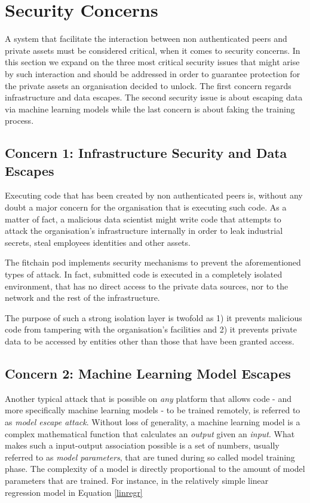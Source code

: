 \documentclass[12pt, a4paper,titlepage]{extreport}
\begin{document}
\section{Security Concerns}
A system that facilitate the interaction between non authenticated peers and private assets must be considered critical, when it comes to security concerns. In this section we expand on the three most critical security issues that might arise by such interaction and should be addressed in order to guarantee protection for the private assets an organisation decided to unlock. The first concern regards infrastructure and data escapes. The second security issue is about escaping data via machine learning models while the last concern is about faking the training process.

\subsection{Concern 1: Infrastructure Security and Data Escapes}
Executing code that has been created by non authenticated peers is, without any doubt a major concern for the organisation that is executing such code. 
As a matter of fact, a malicious data scientist might write code that attempts to attack the organisation's infrastructure internally in order to leak industrial secrets, steal employees identities and other assets.

The fitchain pod implements security mechanisms to prevent the aforementioned types of attack. In fact, submitted code is executed in a completely isolated environment, that has no direct access to the private data sources, nor to the network and the rest of the infrastructure.

The purpose of such a strong isolation layer is twofold as 1) it prevents malicious code from tampering with the organisation's facilities and 2) it prevents private data to be accessed by entities other than those that have been granted access.


\subsection{Concern 2: Machine Learning Model Escapes}
Another typical attack that is possible on \textit{any} platform that allows code - and more specifically machine learning models - to be trained remotely, is referred to as \textit{model escape attack}. 
Without loss of generality, a machine learning model is a complex mathematical function that calculates an \textit{output} given an \textit{input}. What makes such a input-output association possible is a set of numbers, usually referred to as \textit{model parameters}, that are tuned during so called model training phase. 
The complexity of a model is directly proportional to the amount of model parameters that are trained. For instance, in the relatively simple linear regression model in Equation \ref{linregr}
\end{document}
